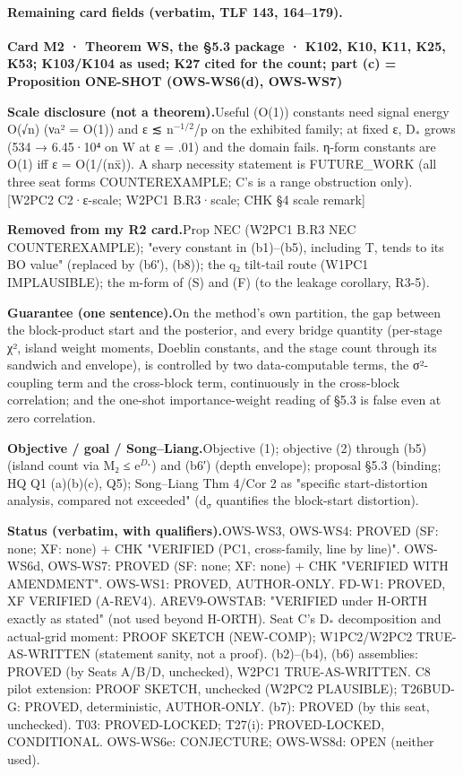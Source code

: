 \paragraph{Remaining card fields (verbatim, TLF 143, 164–179).}
{\small
\par\smallskip\noindent\textbf{Card M2 · Theorem WS, the §5.3 package · K102, K10, K11, K25, K53; K103/K104 as used; K27 cited for the count; part (c) = Proposition ONE-SHOT (OWS-WS6(d), OWS-WS7)}
\par\smallskip\noindent\textbf{Scale disclosure (not a theorem).}\enspace Useful (O(1)) constants need signal energy O(√n) (νa² = O(1)) and ε ≲ n$^{−1/2}$/p on the exhibited family; at fixed ε, D$_{*}$ grows (534 → 6.45·10⁴ on W at ε = .01) and the domain fails. η-form constants are O(1) iff ε = O(1/(nx̄)). A sharp necessity statement is FUTURE\_WORK (all three seat forms COUNTEREXAMPLE; C's is a range obstruction only). [W2PC2 C2·ε-scale; W2PC1 B.R3·scale; CHK §4 scale remark]
\par\smallskip\noindent\textbf{Removed from my R2 card.}\enspace Prop NEC (W2PC1 B.R3 NEC COUNTEREXAMPLE); "every constant in (b1)–(b5), including T, tends to its BO value" (replaced by (b6′), (b8)); the q₂ tilt-tail route (W1PC1 IMPLAUSIBLE); the m-form of (S) and (F) (to the leakage corollary, R3-5).
\par\smallskip\noindent\textbf{Guarantee (one sentence).}\enspace On the method's own partition, the gap between the block-product start and the posterior, and every bridge quantity (per-stage χ², island weight moments, Doeblin constants, and the stage count through its sandwich and envelope), is controlled by two data-computable terms, the σ²-coupling term and the cross-block term, continuously in the cross-block correlation; and the one-shot importance-weight reading of §5.3 is false even at zero correlation.
\par\smallskip\noindent\textbf{Objective / goal / Song–Liang.}\enspace Objective (1); objective (2) through (b5) (island count via M₂ ≤ e$^{D_{*}}$) and (b6′) (depth envelope); proposal §5.3 (binding; HQ Q1 (a)(b)(c), Q5); Song–Liang Thm 4/Cor 2 as "specific start-distortion analysis, compared not exceeded" (d$_{σ}$ quantifies the block-start distortion).
\par\smallskip\noindent\textbf{Status (verbatim, with qualifiers).}\enspace OWS-WS3, OWS-WS4: PROVED (SF: none; XF: none) + CHK "VERIFIED (PC1, cross-family, line by line)". OWS-WS6d, OWS-WS7: PROVED (SF: none; XF: none) + CHK "VERIFIED WITH AMENDMENT". OWS-WS1: PROVED, AUTHOR-ONLY. FD-W1: PROVED, XF VERIFIED (A-REV4). AREV9-OWSTAB: "VERIFIED under H-ORTH exactly as stated" (not used beyond H-ORTH). Seat C's D$_{*}$ decomposition and actual-grid moment: PROOF SKETCH (NEW-COMP); W1PC2/W2PC2 TRUE-AS-WRITTEN (statement sanity, not a proof). (b2)–(b4), (b6) assemblies: PROVED (by Seats A/B/D, unchecked), W2PC1 TRUE-AS-WRITTEN. C8 pilot extension: PROOF SKETCH, unchecked (W2PC2 PLAUSIBLE); T26BUD-G: PROVED, deterministic, AUTHOR-ONLY. (b7): PROVED (by this seat, unchecked). T03: PROVED-LOCKED; T27(i): PROVED-LOCKED, CONDITIONAL. OWS-WS6e: CONJECTURE; OWS-WS8d: OPEN (neither used).
}
